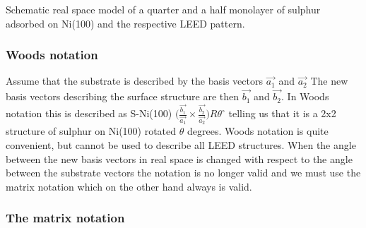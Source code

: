 \vspace*{11cm}

 Schematic real space model of a quarter and a half monolayer of sulphur adsorbed on Ni(100) and the respective LEED pattern.

\vspace{1cm}

\subsubsection{Woods notation} Assume that the substrate is described by the basis vectors $\overrightarrow{a_1}$ and $\overrightarrow{a_2}$ The new basis vectors describing the surface structure are then $\overrightarrow{b_1}$ and  $\overrightarrow{b_2}$. In  Woods notation this is described as S-Ni(100) $\biggl(\frac{\overrightarrow{b_1}}{\overrightarrow{a_1}} \times \frac{\overrightarrow{b_2}}{\overrightarrow{a_2}} \biggr)R\theta^{\circ}$ telling us that it is a 2x2 structure of sulphur on  Ni(100) rotated $\theta$ degrees. Woods notation is quite convenient, but cannot be used to describe all LEED structures. When the angle between the new basis vectors in real space is changed with respect to the angle between the  substrate vectors the notation is no longer valid and we must use the matrix notation which on the other hand always is valid.

\subsubsection{The matrix notation}

